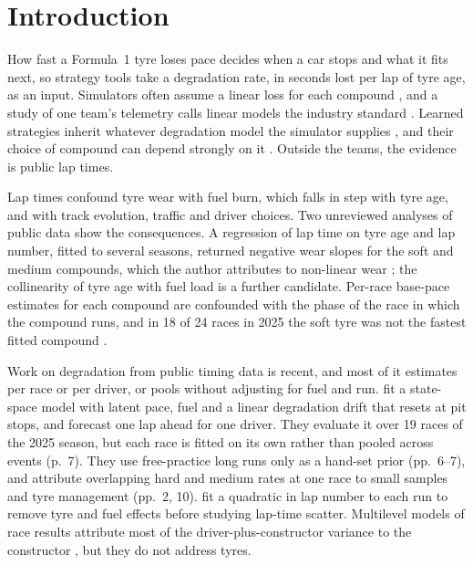 \section{Introduction}\label{sec:intro}

How fast a Formula~1 tyre loses pace decides when a car stops and what it fits next, so strategy tools take a degradation rate, in seconds lost per lap of tyre age, as an input.
Simulators often assume a linear loss for each compound \citep{heilmeier2020virtual}, and a study of one team's telemetry calls linear models the industry standard \citep{todd2025explainable}.
Learned strategies inherit whatever degradation model the simulator supplies \citep{thomas2025explainable}, and their choice of compound can depend strongly on it \citep{fieni2026multiagent}.
Outside the teams, the evidence is public lap times.

Lap times confound tyre wear with fuel burn, which falls in step with tyre age, and with track evolution, traffic and driver choices.
Two unreviewed analyses of public data show the consequences.
A regression of lap time on tyre age and lap number, fitted to several seasons, returned negative wear slopes for the soft and medium compounds, which the author attributes to non-linear wear \citep{joshi2026persistence}; the collinearity of tyre age with fuel load is a further candidate.
Per-race base-pace estimates for each compound are confounded with the phase of the race in which the compound runs, and in 18 of 24 races in 2025 the soft tyre was not the fastest fitted compound \citep{santillana2026pitwall}.

Work on degradation from public timing data is recent, and most of it estimates per race or per driver, or pools without adjusting for fuel and run.
\citet{cappelloHoegh2026} fit a state-space model with latent pace, fuel and a linear degradation drift that resets at pit stops, and forecast one lap ahead for one driver.
They evaluate it over 19 races of the 2025 season, but each race is fitted on its own rather than pooled across events (p.~7).
They use free-practice long runs only as a hand-set prior (pp.~6--7), and attribute overlapping hard and medium rates at one race to small samples and tyre management (pp.~2, 10).
\citet{heilmeier2020monte} fit a quadratic in lap number to each run to remove tyre and fuel effects before studying lap-time scatter.
Multilevel models of race results attribute most of the driver-plus-constructor variance to the constructor \citep{bell2016formula,vankesteren2023bayesian}, but they do not address tyres.

